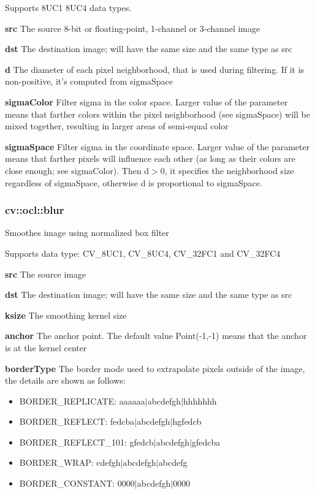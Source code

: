 \documentclass{article}
\begin{document}
Supports 8UC1 8UC4 data types.

\textbf{src }The source 8-bit or floating-point, 1-channel or 3-channel
image

\textbf{dst }The destination image; will have the same size and the same
type as src

\textbf{d }The diameter of each pixel neighborhood, that is used during
filtering. If it is non-positive, it's computed from sigmaSpace

\textbf{sigmaColor }Filter sigma in the color space. Larger value of the
parameter means that farther colors within the pixel neighborhood (see
sigmaSpace) will be mixed together, resulting in larger areas of semi-equal
color

\textbf{sigmaSpace }Filter sigma in the coordinate space. Larger value of
the parameter means that farther pixels will influence each other (as long
as their colors are close enough; see sigmaColor). Then d$>$0, it specifies
the neighborhood size regardless of sigmaSpace, otherwise d is proportional
to sigmaSpace.

\newpage

\subsubsection{cv::ocl::blur }
\label{subsubsec:mylabel32}
Smoothes image using normalized box filter

Supports data type: CV{\_}8UC1, CV{\_}8UC4, CV{\_}32FC1 and CV{\_}32FC4

\textbf{src }The source image

\textbf{dst }The destination image; will have the same size and the same
type as src

\textbf{ksize }The smoothing kernel size

\textbf{anchor }The anchor point. The default value Point(-1,-1) means that
the anchor is at the kernel center

\textbf{borderType }The border mode used to extrapolate pixels outside of
the image, the details are shown as follows:

\begin{itemize}
\item BORDER{\_}REPLICATE: aaaaaa$\vert $abcdefgh$\vert $hhhhhhh
\item BORDER{\_}REFLECT: fedcba$\vert $abcdefgh$\vert $hgfedcb
\item BORDER{\_}REFLECT{\_}101: gfedcb$\vert $abcdefgh$\vert $gfedcba
\item BORDER{\_}WRAP: cdefgh$\vert $abcdefgh$\vert $abcdefg
\item BORDER{\_}CONSTANT: 0000$\vert $abcdefgh$\vert $0000
\end{itemize}
\end{document}
